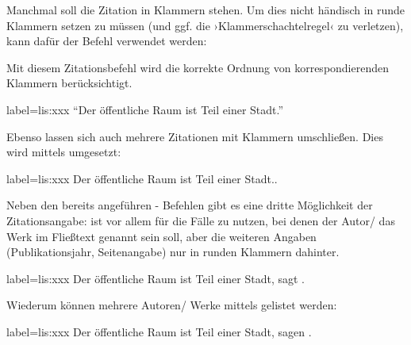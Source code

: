Manchmal soll die Zitation in Klammern stehen.
Um dies nicht händisch in runde Klammern setzen zu müssen (und ggf. die ›Klammerschachtelregel‹ zu verletzen),
kann dafür der Befehl   verwendet werden:
Mit diesem Zitationsbefehl wird die korrekte Ordnung von korrespondierenden Klammern berücksichtigt.
\begin{lfgwexample}{label={lis:xxx}}
\enquote{Der öffentliche Raum ist Teil einer Stadt.} \parencite{Osland2016}
\end{lfgwexample}

Ebenso lassen sich auch mehrere Zitationen mit Klammern umschließen.
Dies wird mittels  umgesetzt:
\begin{lfgwexample}{label={lis:xxx}}
Der öffentliche Raum ist Teil einer Stadt.\parencites(s.)(){Osland2016}%
[vgl.][]{Evangelidis2014}.
\end{lfgwexample}

Neben den bereits angeführen - Befehlen gibt es eine dritte Möglichkeit der Zitationsangabe:
 ist vor allem für die Fälle zu nutzen, 
bei denen der Autor/ das Werk im Fließtext genannt sein soll, 
aber die weiteren Angaben (Publikationsjahr, Seitenangabe) nur in runden Klammern dahinter.

\begin{lfgwexample}{label={lis:xxx}}
Der öffentliche Raum ist Teil einer Stadt, sagt \textcite{Osland2016}.
\end{lfgwexample}

Wiederum können mehrere Autoren/ Werke mittels   gelistet werden:
\begin{lfgwexample}{label={lis:xxx}}
Der öffentliche Raum ist Teil einer Stadt, sagen \textcites{Osland2016}%
[vgl.][]{Evangelidis2014}.
\end{lfgwexample}



